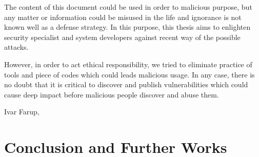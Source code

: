\documentclass[medieteknikk]{gucmasterthesis}
\begin{document}
The content of this document could be used in order to malicious purpose, but any matter or information could be misused in the life and ignorance is not known well as a defense strategy. In this purpose, this thesis aims to enlighten security specialist and system developers against recent way of the possible attacks. 

However, in order to act ethical responsibility, we tried to eliminate practice of tools and piece of codes which could leads malicious usage. In any case, there is no doubt that it is critical to discover and publish vulnerabilities which could cause deep impact before malicious people discover and abuse them.


\vspace{\baselineskip}
\noindent Ivar Farup, \gucmasterthesisdate
\tableofcontents
\listoffigures
\listoftables






\chapter{Conclusion and Further Works}


\appendix


\end{document}
